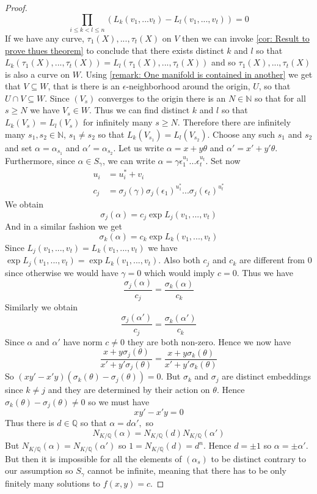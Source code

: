 \documentclass{article}
\newcommand{\mbb}[1]{\mathbb{#1}}
\numberwithin{equation}{section}
\begin{document}
\begin{proof}
    $$\prod_{i \leq k < l \leq n} (L_k(v_1, ...v_t) - L_l(v_1, ...,  v_t)) = 0$$
    If we have any curve, $\tau_1(X), ..., \tau_t(X)$ on $V$ then we can invoke \cref{cor: Result to prove thues theorem} to conclude that there exists distinct $k$ and $l$ so that $L_{k}(\tau_1(X), ..., \tau_t(X))= L_{l}(\tau_1(X), ..., \tau_t(X))$ and so $\tau_1(X), ..., \tau_t(X)$ is also a curve on $W$. Using \cref{remark: One manifold is contained in another} we get that $V \subseteq W$, that is there is an $\epsilon$-neighborhood around the origin, $U$, so that $U \cap V \subseteq W$. Since $(V_s)$ converges to the origin there is an $N \in \mbb N$ so that for all $s \geq N$ we have $V_s \in W$. Thus we can find distinct $k$ and $l$ so that $L_k(V_s) = L_l(V_s)$ for infinitely many $s \geq N$. Therefore there are infinitely many $s_1, s_2 \in \mbb N$, $s_1 \neq s_2$ so that $L_k(V_{s_1}) = L_l(V_{s_2})$. Choose any such $s_1$ and $s_2$ and set $\alpha = \alpha_{s_1}$ and $\alpha' = \alpha_{s_2}$. Let us write $\alpha = x + y \theta$ and $\alpha' = x' + y'\theta$. Furthermore, since $\alpha \in S_\gamma$, we can write $\alpha = \gamma \epsilon_1^{u_1}...\epsilon_t^{u_t}$. Set now
    \begin{align*}
        u_i & = u_i^* + v_i                                                                 \\
        c_j & = \sigma_j(\gamma)\sigma_j(\epsilon_1)^{u_1^*}...\sigma_j(\epsilon_t)^{u_t^*}
    \end{align*}
    We obtain
    $$\sigma_j(\alpha) = c_j \exp L_j(v_1, ..., v_t)$$
    And in a similar fashion we get
    $$\sigma_k(\alpha) = c_k \exp L_k(v_1, ..., v_t)$$
    Since $L_j(v_1, ..., v_t) = L_k(v_1, ..., v_t)$ we have $\exp L_j(v_1, ..., v_t) = \exp L_k(v_1, ..., v_t)$. Also both $c_j$ and $c_k$ are different from 0 since otherwise we would have $\gamma = 0$ which would imply $c = 0$. Thus we have
    $$\frac{\sigma_j(\alpha)}{c_j} = \frac{\sigma_k(\alpha)}{c_k}$$
    Similarly we obtain
    $$\frac{\sigma_j(\alpha')}{c_j} = \frac{\sigma_k(\alpha')}{c_k}$$
    Since $\alpha$ and $\alpha'$ have norm $c \neq 0$ they are both non-zero. Hence we now have
    $$\frac{x + y \sigma_j(\theta)}{x' + y' \sigma_j(\theta)} = \frac{x + y \sigma_k(\theta)}{x' + y' \sigma_k(\theta)}$$
    So
    $(xy' - x'y)(\sigma_k(\theta) - \sigma_j(\theta)) = 0$.
    But $\sigma_k$ and $\sigma_j$ are distinct embeddings since $k \neq j$ and they are determined by their action on $\theta$. Hence $\sigma_k(\theta) - \sigma_j(\theta) \neq 0$ so we must have
    $$xy' - x'y = 0$$
    Thus there is $d \in \mbb Q$ so that
    $\alpha = d\alpha',$ so $$N_{K/\mbb Q}(\alpha) = N_{K/\mbb Q}(d) N_{K/\mbb Q}(\alpha')$$
    But $N_{K/\mbb Q}(\alpha) = N_{K/\mbb Q}(\alpha')$ so $1 = N_{K/\mbb Q}(d) = d^n$. Hence $d = \pm 1$ so $\alpha = \pm \alpha'$. But then it is impossible for all the elements of $(\alpha_s)$ to be distinct contrary to our assumption so $S_\gamma$ cannot be infinite, meaning that there has to be only finitely many solutions to $f(x, y) = c$.
\end{proof}
\end{document}
